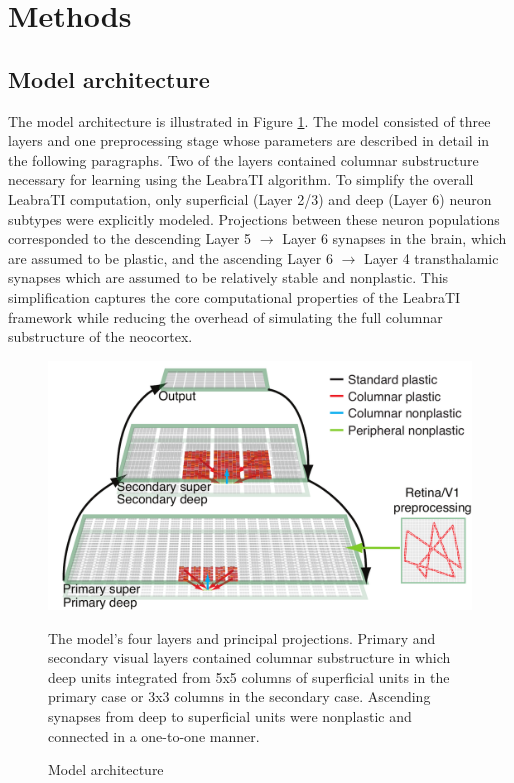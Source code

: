 \documentclass[dwyatte_dissertation.tex]{subfiles}
\begin{document}
\section{Methods}

\subsection{Model architecture}

The model architecture is illustrated in Figure \ref{fig:v1_v2_output}. The model consisted of three layers and one preprocessing stage whose parameters are described in detail in the following paragraphs. Two of the layers contained columnar substructure necessary for learning using the LeabraTI algorithm. To simplify the overall LeabraTI computation, only superficial (Layer 2/3) and deep (Layer 6) neuron subtypes were explicitly modeled. Projections between these neuron populations corresponded to the descending Layer 5 $\rightarrow$ Layer 6 synapses in the brain, which are assumed to be plastic, and the ascending Layer 6 $\rightarrow$ Layer 4 transthalamic synapses which are assumed to be relatively stable and nonplastic. This simplification captures the core computational properties of the LeabraTI framework while reducing the overhead of simulating the full columnar substructure of the neocortex.

\begin{figure}[h!]
\begin{center}
\includegraphics[width=160mm]{figs/chap_sims/v1_v2_output_ti_annotated.pdf}
\end{center}
\caption{Model architecture}{The model's four layers and principal projections. Primary and secondary visual layers contained columnar substructure in which deep units integrated from 5x5 columns of superficial units in the primary case or 3x3 columns in the secondary case. Ascending synapses from deep to superficial units were nonplastic and connected in a one-to-one manner.}
\label{fig:v1_v2_output}
\end{figure}
\end{document}

